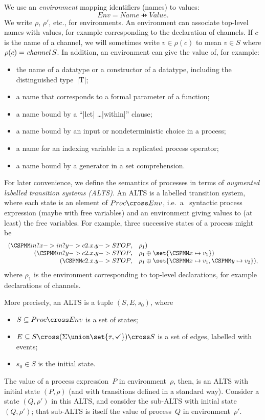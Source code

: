 

We use an \emph{environment} mapping identifiers (names) to values:
\[
Env = Name \pfun Value.
\]
We write $\rho$, $\rho'$, etc., for environments.  An environment can
associate top-level names with values, for example corresponding to the
declaration of channels.  If $c$ is the name of a channel, we will sometimes
write $v \in \rho(c)$ to mean $v \in S$ where $\rho(c) = \mathop{\it channel} S$.
In addition, an environment can give the value of, for example:
%
\begin{itemize}
\item the name of a datatype or a constructor of a datatype, including the
  distinguished type~|T|;
\item a name that corresponds to a formal parameter of a function;
\item a name bound by a ``|let| \ldots |within|'' clause;
\item a name bound by an input or nondeterministic choice in a process;
\item a name for an indexing variable in a replicated process operator;
\item a name bound by a generator in a set comprehension.
\end{itemize}

For later convenience, we define the semantics of processes in terms of
\emph{augmented labelled transition systems (ALTS)}.  An ALTS is a labelled
transition system, where each state is an element of $Proc \cross Env$, i.e.~a
\CSPm\ syntactic process expression (maybe with free variables) and an
environment giving values to (at least) the free variables.  For example,
three successive states of a process might be
\[
\begin{array}{rl}
(\M{in?x -> in?y -> c2.x.y -> STOP}, & \rho_1) \\
(\M{in?y -> c2.x.y -> STOP}, & \rho_1 \oplus \set{\M{x} \mapsto v_1}) \\
(\M{c2.x.y -> STOP}, & \rho_1 \oplus \set{\M x \mapsto v_1, \M y \mapsto v_2}),
\end{array}
\]
where $\rho_1$ is the environment corresponding to top-level declarations, for
example declarations of channels.  

More precisely, an ALTS is a tuple $(S,E,s_0)$, where
%
\begin{itemize}
\item $S \subseteq Proc \cross Env$ is a set of states;

\item $E \subseteq S \cross (\Sigma \union \set{\tau, \tick}) \cross S$ is a
  set of edges, labelled with events;

\item $s_0 \in S$ is the initial state.
\end{itemize}
%
The value of a process expression~$P$ in environment~$\rho$, then, is an ALTS
with initial state $(P,\rho)$ (and with transitions defined in a standard
way).  Consider a state $(Q,\rho')$ in this ALTS, and consider the sub-ALTS
with initial state $(Q,\rho')$; that sub-ALTS is itself the value of
process~$Q$ in environment~$\rho'$.


